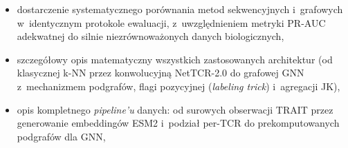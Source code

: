 \documentclass{SGGW-thesis}
\begin{document}
\begin{itemize}
  \item dostarczenie systematycznego porównania metod sekwencyjnych i~grafowych w~identycznym
        protokole ewaluacji, z~uwzględnieniem metryki PR-AUC adekwatnej do silnie niezrównoważonych
        danych biologicznych,

  \item szczegółowy opis matematyczny wszystkich zastosowanych architektur (od klasycznej
        k-NN przez konwolucyjną NetTCR-2.0 do grafowej GNN z~mechanizmem podgrafów,
        flagi pozycyjnej (\textit{labeling trick}) i~agregacji JK),

  \item opis kompletnego \textit{pipeline'u} danych: od surowych obserwacji TRAIT przez generowanie
        embeddingów ESM2 i~podział per-TCR do prekomputowanych podgrafów dla GNN,

\end{itemize}
\end{document}

